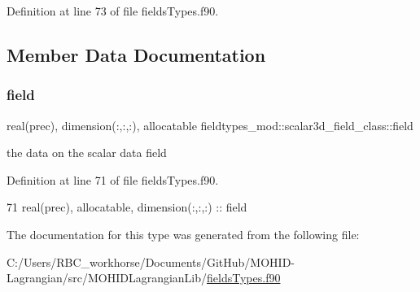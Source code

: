 Definition at line 73 of file fields\+Types.\+f90.



\subsection{Member Data Documentation}
\mbox{\label{structfieldtypes__mod_1_1scalar3d__field__class_a1fc76fc336c07c0189299ae64fee564f}} 
\subsubsection{\texorpdfstring{field}{field}}
{\footnotesize\ttfamily real(prec), dimension(\+:,\+:,\+:), allocatable fieldtypes\+\_\+mod\+::scalar3d\+\_\+field\+\_\+class\+::field\hspace{0.3cm}{\ttfamily [private]}}



the data on the scalar data field 



Definition at line 71 of file fields\+Types.\+f90.


\begin{DoxyCode}
71         \textcolor{keywordtype}{real(prec)}, \textcolor{keywordtype}{allocatable}, \textcolor{keywordtype}{dimension(:,:,:)} :: field
\end{DoxyCode}


The documentation for this type was generated from the following file\+:\begin{DoxyCompactItemize}
\item 
C\+:/\+Users/\+R\+B\+C\+\_\+workhorse/\+Documents/\+Git\+Hub/\+M\+O\+H\+I\+D-\/\+Lagrangian/src/\+M\+O\+H\+I\+D\+Lagrangian\+Lib/\mbox{\hyperlink{fields_types_8f90}{fields\+Types.\+f90}}\end{DoxyCompactItemize}
